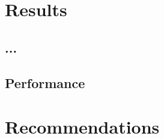 \documentclass[a4paper,11pt]{kth-mag}
\begin{document}
\chapter{Results}
\label{ch:results}

\section{...}


\section{Performance}

\chapter{Recommendations}
\label{ch:recommendations}



\end{document}
